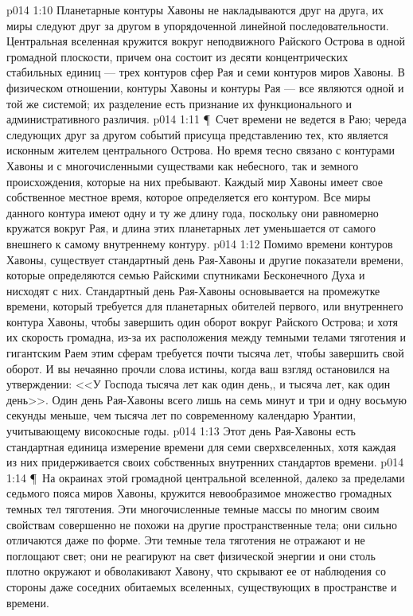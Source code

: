 \vs p014 1:10 Планетарные контуры Хавоны не накладываются друг на друга, их миры следуют друг за другом в упорядоченной линейной последовательности. Центральная вселенная кружится вокруг неподвижного Райского Острова в одной громадной плоскости, причем она состоит из десяти концентрических стабильных единиц --- трех контуров сфер Рая и семи контуров миров Хавоны. В физическом отношении, контуры Хавоны и контуры Рая --- все являются одной и той же системой; их разделение есть признание их функционального и административного различия.
\vs p014 1:11 \P\ Счет времени не ведется в Раю; череда следующих друг за другом событий присуща представлению тех, кто является исконным жителем центрального Острова. Но время тесно связано с контурами Хавоны и с многочисленными существами как небесного, так и земного происхождения, которые на них пребывают. Каждый мир Хавоны имеет свое собственное местное время, которое определяется его контуром. Все миры данного контура имеют одну и ту же длину года, поскольку они равномерно кружатся вокруг Рая, и длина этих планетарных лет уменьшается от самого внешнего к самому внутреннему контуру.
\vs p014 1:12 Помимо времени контуров Хавоны, существует стандартный день Рая\hyp{}Хавоны и другие показатели времени, которые определяются семью Райскими спутниками Бесконечного Духа и нисходят с них. Стандартный день Рая\hyp{}Хавоны основывается на промежутке времени, который требуется для планетарных обителей первого, или внутреннего контура Хавоны, чтобы завершить один оборот вокруг Райского Острова; и хотя их скорость громадна, из\hyp{}за их расположения между темными телами тяготения и гигантским Раем этим сферам требуется почти тысяча лет, чтобы завершить свой оборот. И вы нечаянно прочли слова истины, когда ваш взгляд остановился на утверждении: <<У Господа тысяча лет как один день,, и тысяча лет, как один день>>. Один день Рая\hyp{}Хавоны всего лишь на семь минут и три и одну восьмую секунды меньше, чем тысяча лет по современному календарю Урантии, учитывающему високосные годы.
\vs p014 1:13 Этот день Рая\hyp{}Хавоны есть стандартная единица измерение времени для семи сверхвселенных, хотя каждая из них придерживается своих собственных внутренних стандартов времени.
\vs p014 1:14 \P\ На окраинах этой громадной центральной вселенной, далеко за пределами седьмого пояса миров Хавоны, кружится невообразимое множество громадных темных тел тяготения. Эти многочисленные темные массы по многим своим свойствам совершенно не похожи на другие пространственные тела; они сильно отличаются даже по форме. Эти темные тела тяготения не отражают и не поглощают свет; они не реагируют на свет физической энергии и они столь плотно окружают и обволакивают Хавону, что скрывают ее от наблюдения со стороны даже соседних обитаемых вселенных, существующих в пространстве и времени.
